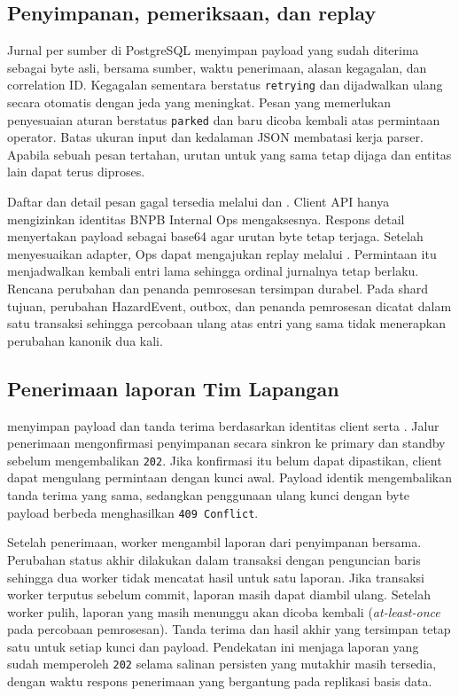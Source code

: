 \subsection{Penyimpanan, pemeriksaan, dan replay}

Jurnal per sumber di PostgreSQL menyimpan payload yang sudah diterima sebagai byte asli, bersama sumber, waktu penerimaan, alasan kegagalan, dan correlation ID. Kegagalan sementara berstatus \texttt{retrying} dan dijadwalkan ulang secara otomatis dengan jeda yang meningkat. Pesan yang memerlukan penyesuaian aturan berstatus \texttt{parked} dan baru dicoba kembali atas permintaan operator. Batas ukuran input dan kedalaman JSON membatasi kerja parser. Apabila sebuah pesan tertahan, urutan untuk  yang sama tetap dijaga dan entitas lain dapat terus diproses.

Daftar dan detail pesan gagal tersedia melalui  dan . Client API hanya mengizinkan identitas BNPB Internal Ops mengaksesnya. Respons detail menyertakan payload sebagai base64 agar urutan byte tetap terjaga. Setelah menyesuaikan adapter, Ops dapat mengajukan replay melalui . Permintaan itu menjadwalkan kembali entri lama sehingga ordinal jurnalnya tetap berlaku. Rencana perubahan dan penanda pemrosesan tersimpan durabel. Pada shard tujuan, perubahan HazardEvent, outbox, dan penanda pemrosesan dicatat dalam satu transaksi sehingga percobaan ulang atas entri yang sama tidak menerapkan perubahan kanonik dua kali.

\subsection{Penerimaan laporan Tim Lapangan}

 menyimpan payload dan tanda terima berdasarkan identitas client serta . Jalur penerimaan mengonfirmasi penyimpanan secara sinkron ke primary dan standby sebelum mengembalikan \texttt{202}. Jika konfirmasi itu belum dapat dipastikan, client dapat mengulang permintaan dengan kunci awal. Payload identik mengembalikan tanda terima yang sama, sedangkan penggunaan ulang kunci dengan byte payload berbeda menghasilkan \texttt{409 Conflict}.

Setelah penerimaan, worker mengambil laporan dari penyimpanan bersama. Perubahan status akhir dilakukan dalam transaksi dengan penguncian baris sehingga dua worker tidak mencatat hasil untuk satu laporan. Jika transaksi worker terputus sebelum commit, laporan masih dapat diambil ulang. Setelah worker pulih, laporan yang masih menunggu akan dicoba kembali (\emph{at-least-once} pada percobaan pemrosesan). Tanda terima dan hasil akhir yang tersimpan tetap satu untuk setiap kunci dan payload. Pendekatan ini menjaga laporan yang sudah memperoleh \texttt{202} selama salinan persisten yang mutakhir masih tersedia, dengan waktu respons penerimaan yang bergantung pada replikasi basis data.

